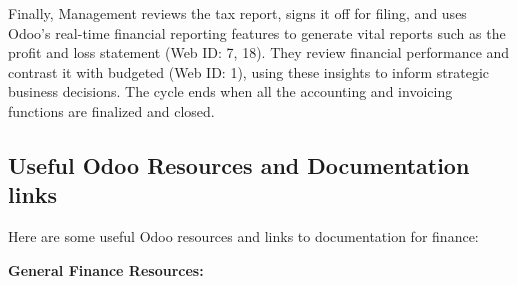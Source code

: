 \documentclass[11pt,a4paper]{article}
\begin{document}
\noindent Finally, Management reviews the tax report, signs it off for filing, and uses Odoo's real-time 
financial reporting features to generate vital reports such as the profit and loss statement (Web 
ID: 7, 18). They review financial performance and contrast it with budgeted (Web ID: 1), using 
these insights to inform strategic business decisions. The cycle ends when all the accounting and 
invoicing functions are finalized and closed.

\subsection{Useful Odoo Resources and Documentation links}
Here are some useful Odoo resources and links to documentation for finance:
\medskip

\noindent\textbf{General Finance Resources:}
\end{document}
